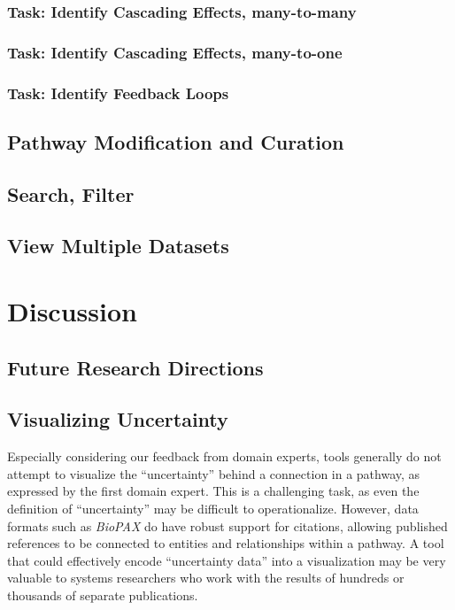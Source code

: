\documentclass{egpubl}
\begin{document}
\subsubsection{Task: Identify Cascading Effects, many-to-many}
\subsubsection{Task: Identify Cascading Effects, many-to-one}


\subsubsection{Task: Identify Feedback Loops}

\subsection{Pathway Modification and Curation}

\subsection{Search, Filter}

\subsection{View Multiple Datasets}


\section{Discussion}

\subsection{Future Research Directions}

\subsection{Visualizing Uncertainty}

Especially considering our feedback from domain experts, tools generally do not attempt to visualize the ``uncertainty'' behind a connection in a pathway, as expressed by the first domain expert. This is a challenging task, as even the definition of ``uncertainty'' may be difficult to operationalize. However, data formats such as \emph{BioPAX} do have robust support for citations, allowing published references to be connected to entities and relationships within a pathway. A tool that could effectively encode ``uncertainty data'' into a visualization may be very valuable to systems researchers who work with the results of hundreds or thousands of separate publications.
\end{document}
